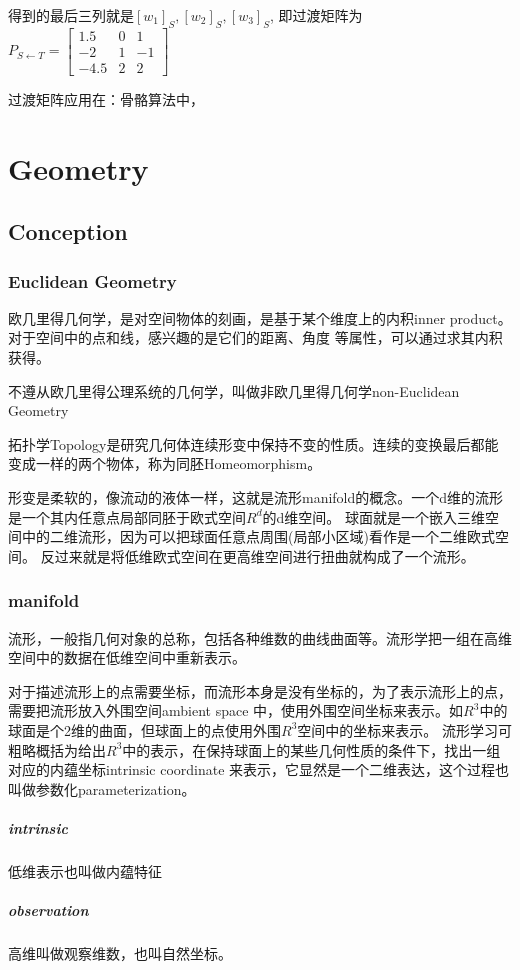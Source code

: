 得到的最后三列就是$[w_1]_S, [w_2]_S,[w_3]_S$, 即过渡矩阵为
\begin{math}
    P_{S \leftarrow T} = \begin{bmatrix}
        1.5 & 0 & 1 \\
        -2 & 1 & -1 \\
        -4.5 & 2 & 2
    \end{bmatrix}
\end{math}

过渡矩阵应用在：骨骼算法中，

\chapter{Geometry}

\section{Conception}

\subsection{Euclidean Geometry}
欧几里得几何学，是对空间物体的刻画，是基于某个维度上的内积inner product。对于空间中的点和线，感兴趣的是它们的距离、角度
等属性，可以通过求其内积获得。

不遵从欧几里得公理系统的几何学，叫做非欧几里得几何学non-Euclidean Geometry

拓扑学Topology是研究几何体连续形变中保持不变的性质。连续的变换最后都能变成一样的两个物体，称为同胚Homeomorphism。

形变是柔软的，像流动的液体一样，这就是流形manifold的概念。一个d维的流形是一个其内任意点局部同胚于欧式空间$R^d$的d维空间。
球面就是一个嵌入三维空间中的二维流形，因为可以把球面任意点周围(局部小区域)看作是一个二维欧式空间。
反过来就是将低维欧式空间在更高维空间进行扭曲就构成了一个流形。

\subsection{manifold}

流形，一般指几何对象的总称，包括各种维数的曲线曲面等。流形学把一组在高维空间中的数据在低维空间中重新表示。

对于描述流形上的点需要坐标，而流形本身是没有坐标的，为了表示流形上的点，需要把流形放入外围空间ambient space
中，使用外围空间坐标来表示。如$R^3$中的球面是个2维的曲面，但球面上的点使用外围$R^3$空间中的坐标来表示。
流形学习可粗略概括为给出$R^3$中的表示，在保持球面上的某些几何性质的条件下，找出一组对应的内蕴坐标intrinsic coordinate 
来表示，它显然是一个二维表达，这个过程也叫做参数化parameterization。

\paragraph{intrinsic}
低维表示也叫做内蕴特征

\paragraph{observation}
高维叫做观察维数，也叫自然坐标。


